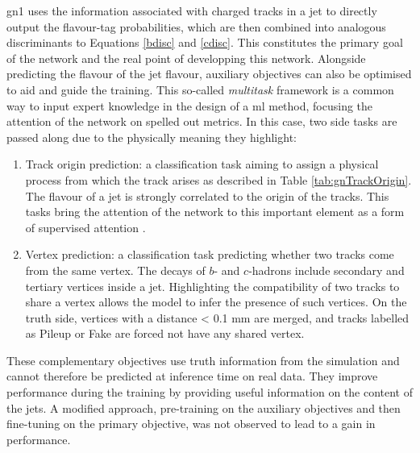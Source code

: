 \gls{gn1} uses the information associated with charged tracks in a jet to directly output the flavour-tag probabilities, which are then combined into analogous discriminants to Equations \ref{bdisc} and \ref{cdisc}. This constitutes the primary goal of the network and the real point of developping this network. Alongside predicting the flavour of the jet flavour, auxiliary objectives can also be optimised to aid and guide the training. This so-called \textit{multitask} framework is a common way to input expert knowledge in the design of a \gls{ml} method, focusing the attention of the network on spelled out metrics. In this case, two side tasks are passed along due to the physically meaning they highlight:
\begin{enumerate}
\item Track origin prediction: a classification task aiming to assign a physical process from which the track arises as described in Table \ref{tab:gnTrackOrigin}. The flavour of a jet is strongly correlated to the origin of the tracks. This tasks bring the attention of the network to this important element as a form of supervised attention \cite{hwang2021selfsupervised}.
\item Vertex prediction: a classification task predicting whether two tracks come from the same vertex. The decays of $b$- and $c$-hadrons include secondary and tertiary vertices inside a jet. Highlighting the compatibility of two tracks to share  a vertex allows the model to infer the presence of such vertices. On the truth side, vertices with a distance < 0.1 mm are merged, and tracks labelled as Pileup or Fake are forced not have any shared vertex.
\end{enumerate}
These complementary objectives use truth information from the simulation and cannot therefore be predicted at inference time on real data. They improve performance during the training by providing useful information on the content of the jets.  A modified approach, pre-training on the auxiliary objectives and then fine-tuning on the primary objective, was not observed to lead to a gain in performance. \\

